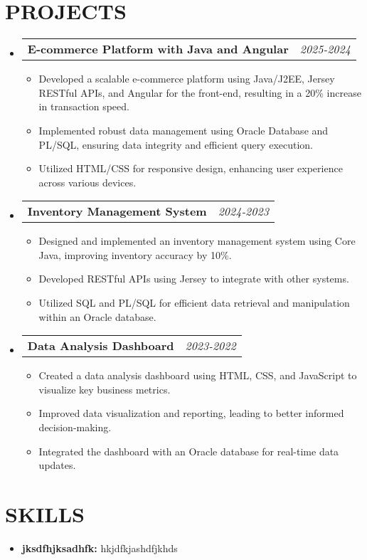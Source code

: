 \documentclass[letterpaper,11pt]{article}
\makeatletter
\newcommand{\resumeItem}[1]{\item\small{{#1 \vspace{-3pt}}}}
\newcommand{\resumeProjectHeading}[2]{\item\begin{tabular*}{0.97\textwidth}{l@{\extracolsep{\fill}}r}\small#1 & #2 \\\end{tabular*}\vspace{-7pt}}
\newcommand{\resumeSubHeadingListStart}{\begin{itemize}[leftmargin=0.15in, label={}]}
\newcommand{\resumeSubHeadingListEnd}{\end{itemize}}
\newcommand{\resumeItemListStart}{\begin{itemize}}
\newcommand{\resumeItemListEnd}{\end{itemize}\vspace{-5pt}}
\makeatother
\begin{document}
\section{{\fontsize{9pt}{20pt}\selectfont \textbf{PROJECTS}}}\resumeSubHeadingListStart
\resumeProjectHeading{\textbf{E-commerce Platform with Java and Angular}}{\textit{2025-2024}}
\resumeItemListStart
\resumeItem{Developed a scalable e-commerce platform using Java/J2EE, Jersey RESTful APIs, and Angular for the front-end, resulting in a 20\% increase in transaction speed.}
\resumeItem{Implemented robust data management using Oracle Database and PL/SQL, ensuring data integrity and efficient query execution.}
\resumeItem{Utilized HTML/CSS for responsive design, enhancing user experience across various devices.}
\resumeItemListEnd\vspace{-6pt}
\resumeProjectHeading{\textbf{Inventory Management System}}{\textit{2024-2023}}
\resumeItemListStart
\resumeItem{Designed and implemented an inventory management system using Core Java, improving inventory accuracy by 10\%.}
\resumeItem{Developed RESTful APIs using Jersey to integrate with other systems.}
\resumeItem{Utilized SQL and PL/SQL for efficient data retrieval and manipulation within an Oracle database.}
\resumeItemListEnd\vspace{-6pt}
\resumeProjectHeading{\textbf{Data Analysis Dashboard}}{\textit{2023-2022}}
\resumeItemListStart
\resumeItem{Created a data analysis dashboard using HTML, CSS, and JavaScript to visualize key business metrics.}
\resumeItem{Improved data visualization and reporting, leading to better informed decision-making.}
\resumeItem{Integrated the dashboard with an Oracle database for real-time data updates.}
\resumeItemListEnd
\resumeSubHeadingListEnd\vspace{-17pt}
\section{{\fontsize{9pt}{20pt}\selectfont \textbf{SKILLS}}}\resumeSubHeadingListStart
\resumeItem{\textbf{jksdfhjksadhfk:} hkjdfkjashdfjkhds}
\resumeSubHeadingListEnd\vspace{-10pt}
\end{document}
